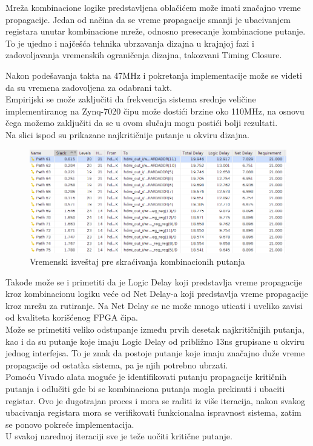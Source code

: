 Mreža kombinacione logike predstavljena oblačićem može imati značajno vreme
propagacije.
Jedan od načina da se vreme propagacije smanji je ubacivanjem registara unutar
kombinacione mreže, odnosno presecanje kombinacione putanje. \\
To je ujedno i najčešća tehnika ubrzavanja dizajna u krajnjoj fazi i
zadovoljavanja vremenskih ograničenja dizajna, takozvani Timing Closure. \\

\newpage

Nakon podešavanja takta na 47MHz i pokretanja implementacije može se videti da
su vremena zadovoljena za odabrani takt. \\
Empirijski se može zaključiti da frekvencija sistema srednje veličine
implementiranog na Zynq-7020 čipu može dostići brzine oko 110MHz, na osnovu
čega možemo zaključiti da se u ovom slučaju mogu postići bolji
rezultati. \\
Na slici ispod su prikazane najkritičnije putanje u okviru dizajna. \\

\begin{figure}[H]
  \centering
  \includegraphics[width=1\linewidth]{results/implementation/pygears_slow/timing.png}
  \caption{Vremenski izveštaj pre skraćivanja kombinacionih putanja}
  \label{slow_time}
\end{figure}

Takođe može se i primetiti da je Logic Delay koji predstavlja vreme propagacije
kroz kombinacionu logiku veće od Net Delay-a koji predstavlja vreme
propagacije kroz mrežu za rutiranje.
Na Net Delay se ne može mnogo uticati i uveliko zavisi od kvaliteta korišćenog
FPGA čipa. \\

Može se primetiti veliko odstupanje između prvih desetak najkritičnijih putanja,
kao i da su putanje koje imaju Logic Delay od približno 13ns grupisane u okviru
jednog interfejsa.
To je znak da postoje putanje koje imaju značajno duže vreme propagacije od
ostatka sistema, pa je njih potrebno ubrzati. \\
Pomoću Vivado alata moguće je identifikovati putanju propagacije kritičnih
putanja i odlučiti gde bi se kombinaciona putanja mogla prekinuti i ubaciti
registar.
Ovo je dugotrajan proces i mora se raditi iz više iteracija, nakon svakog
ubacivanja registara mora se verifikovati funkcionalna ispravnost sistema, zatim
se ponovo pokreće implementacija. \\
U svakoj narednoj iteraciji sve je teže uočiti kritične putanje. \\

